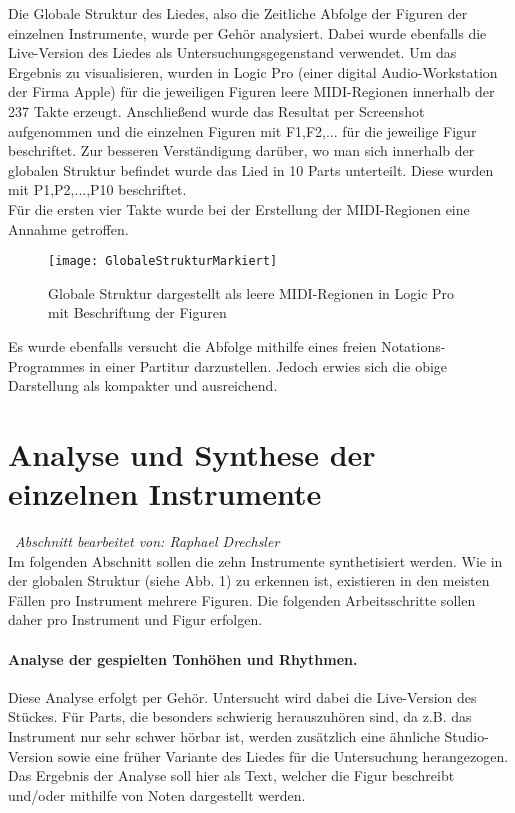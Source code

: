 \documentclass[
10pt, %
a4paper, %
oneside, %
headinclude,footinclude, %
BCOR5mm, %
]{scrartcl}
\begin{document}
\noindent Die Globale Struktur des Liedes, also die Zeitliche Abfolge der Figuren der einzelnen Instrumente, wurde per Gehör analysiert. Dabei wurde ebenfalls die Live-Version des Liedes als Untersuchungsgegenstand verwendet. Um das Ergebnis zu visualisieren, wurden in Logic Pro\cite{Logic} (einer digital Audio-Workstation der Firma Apple) für die jeweiligen Figuren leere MIDI-Regionen innerhalb der 237 Takte erzeugt.
Anschließend wurde das Resultat per Screenshot aufgenommen und die einzelnen Figuren mit F1,F2,... für die jeweilige Figur beschriftet. Zur besseren Verständigung darüber, wo man sich innerhalb der globalen Struktur befindet wurde das Lied in 10 Parts unterteilt. Diese wurden mit P1,P2,...,P10 beschriftet.\\
Für die ersten vier Takte wurde bei der Erstellung der MIDI-Regionen eine Annahme getroffen.

\begin{figure}[h]
	\centering 
	\texttt{[image: GlobaleStrukturMarkiert]} 
	\caption{Globale Struktur dargestellt als leere MIDI-Regionen in Logic Pro mit Beschriftung der Figuren}
\end{figure}

\noindent Es wurde ebenfalls versucht die Abfolge mithilfe eines freien Notations-Programmes in einer Partitur darzustellen. Jedoch erwies sich die obige Darstellung als kompakter und ausreichend.

\section{Analyse und Synthese der einzelnen Instrumente}\
\textit{Abschnitt bearbeitet von: Raphael Drechsler}\\

\noindent Im folgenden Abschnitt sollen die zehn Instrumente synthetisiert werden. Wie in der globalen Struktur (siehe Abb. 1) zu erkennen ist, existieren in den meisten Fällen pro Instrument mehrere Figuren. Die folgenden Arbeitsschritte sollen daher pro Instrument und Figur erfolgen.

\paragraph{Analyse der gespielten Tonhöhen und Rhythmen.}  Diese Analyse erfolgt per Gehör. Untersucht wird dabei die Live-Version\cite{YT1} des Stückes. Für Parts, die besonders schwierig herauszuhören sind, da z.B. das Instrument nur sehr schwer hörbar ist, werden zusätzlich eine ähnliche Studio-Version\cite{YT2} sowie eine früher Variante\cite{YT3} des Liedes für die Untersuchung herangezogen.	Das Ergebnis der Analyse soll hier als Text, welcher die Figur beschreibt und/oder mithilfe von Noten dargestellt werden. 
\end{document}
